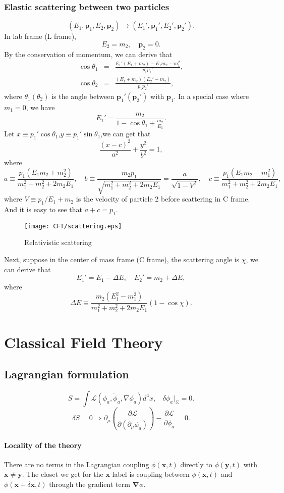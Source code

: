 \subsection{Elastic scattering between two particles}
\[(E_1,\bm{p}_1,E_2,\bm{p}_2) \to (E_1',\bm{p}_1',E_2',\bm{p}_2').\]
In lab frame (L frame),
\[E_2 = m_2 , \quad \bm{p}_2 = 0.\]
By the conservation of momentum, we can derive that
\begin{eqnarray}
	\cos \theta_1 &=& \frac{E_1'(E_1+m_2)-E_1 m_2 - m_1^2}{p_1 p_1'}, \nonumber \\
	\cos \theta_2 &=& \frac{(E_1+m_2)(E_2'-m_2)}{p_1 p_2'}, \nonumber
\end{eqnarray}
where $\theta_1(\theta_2)$ is the angle between $\bm{p}_1'(\bm{p}_2')$ with $\bm{p}_1$.
In a special case where $m_1 =0$, we have
\[E_1' = \frac{m_2}{1-\cos\theta_1 + \frac{m_2}{E_1}}.\]
Let $x \equiv p_1'\cos\theta_1$,$y \equiv p_1'\sin\theta_1$,we can get that
\[\frac{(x-c)^2}{a^2}+\frac{y^2}{b^2}=1,\]
where
\[a \equiv \frac{p_1(E_1m_2+m_2^2)}{m_1^2 + m_2^2 + 2m_2 E_1}, \quad b \equiv \frac{m_2 p_1}{\sqrt{m_1^2 + m_2^2 + 2m_2 E_1}} = \frac{a}{\sqrt{1-V^2}} , \quad c \equiv \frac{ p_1(E_1m_2+m_1^2)}{m_1^2 + m_2^2 + 2m_2 E_1},\]
where $V \equiv p_1 / {E_1 + m_2}$ is the velocity of particle 2 before scattering in C frame. 
And it is easy to see that $a + c = p_1$.
\begin{figure}[!h]
	\centering
	\texttt{[image: CFT/scattering.eps]}
	\caption{Relativistic scattering}
\end{figure}
\noindent
Next, suppose in the center of mass frame (C frame), the scattering angle is $\chi$, we can derive that
\[E_1' = E_1 - \Delta E , \quad E_2' = m_2 + \Delta E,\]
where
\[\Delta E \equiv \frac{m_2(E_1^2-m_1^2)}{m_1^2 + m_2^2 + 2m_2E_1}(1-\cos\chi).\]

\chapter{Classical Field Theory}
\section{Lagrangian formulation}
\[S = \int \mathcal{L}(\phi_a,\dot{\phi}_a,\nabla \phi_a) d^4 x, \ \ \ \ \delta \phi_a |_{\Sigma} = 0.\]
\[\delta S = 0 \Rightarrow \partial_{\mu} \left (\frac{\partial \mathcal{L}}{\partial (\partial_{\mu} \phi_a)} \right ) - \frac{\partial \mathcal{L}}{\partial \phi_a} = 0.\]
\subsubsection{Locality of the theory}
There are no terms in the Lagrangian coupling $\phi(\bm{x},t)$ directly to  $\phi(\bm{y},t)$ with $\bm{x} \neq \bm{y}$. The closet we get for the $\bm{x}$ label is coupling between $\phi(\bm{x},t)$ and $\phi(\bm{x}+\delta\bm{x},t)$ through the gradient term $\bm{\nabla} \phi$.

